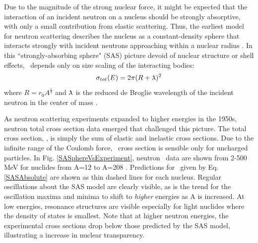 Due to the magnitude of the strong nuclear force, it might be expected that 
the interaction of an incident neutron on a nucleus should be strongly
absorptive, with only a small contribution from elastic scattering. Thus, the
earliest model for neutron scattering describes the nucleus as a constant-density
sphere that interacts strongly with incident neutrons approaching within a nuclear radius
\cite{Feshbach1949}. In this ``strongly-absorbing sphere" (SAS) picture devoid of nuclear structure
or shell effects, \tot\ depends only on size scaling of the interacting bodies:
\begin{equation} \label{SASAbsolute}
    \sigma_{tot}(E) = 2\pi(R + \lambdabar)^{2}
\end{equation}
where $R=r_{0}A^{\frac{1}{3}}$ and $\lambdabar$ is the reduced de Broglie wavelength
of the incident neutron in the center of mass \cite{Fernbach1949, Satchler1980}. 

As neutron scattering experiments expanded to higher energies in the 1950s, 
neutron total cross section data emerged that challenged this picture. The total
cross section, \tot, is simply the sum of elastic and inelastic cross sections.
Due to the infinite range of the Coulomb force, \tot\ cross section is sensible only for
uncharged particles. In Fig.
\ref{SASphereVsExperiment}, neutron \tot\ data are shown from 2-500
MeV for nuclides from A=12 to A=208 \cite{Finlay1993, Schwartz1974, Poenitz1983, Abfalterer2000, 
Abfalterer2001}. Predictions for \tot\ given by Eq. \ref{SASAbsolute} are shown as thin dashed 
lines for each nucleus. Regular oscillations about the SAS model are clearly
visible, as is the trend for the oscillation maxima and minima to shift to \textit{higher}
energies as 
A is increased. At low energies, resonance structures are visible especially for light nuclides 
where the density of states is smallest. Note that at higher neutron energies, the experimental
cross sections drop below those predicted by the SAS model, illustrating
a increase in nuclear transparency.

